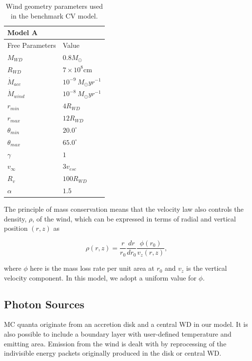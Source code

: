 \documentclass[preprint, a4paper, 11pt]{aastex}
\begin{document}
\begin{table}
\centering
\begin{tabular}{p{3cm}p{4cm}}
Model A \\
\hline Free Parameters 	&	 Value \\ 
\hline \hline 
$M_{WD}$ 	 &	 $0.8 M_{\odot}$ \\ 
$R_{WD}$ 	 &	 $7\times10^{8}$cm\\ 
$\dot{M}_{acc}$ 	 &	 $10^{-9}~M_{\odot}yr^{-1}$\\ 
$\dot{M}_{wind}$  &	$10^{-8}~M_{\odot}yr^{-1}$\\ 
$r_{min}$ 	&	 $4 R_{WD}$\\ 
$r_{max}$ 	&	 $12 R_{WD}$ \\ 
$\theta_{min}$ 	&	 $20.0^{\circ}$ \\ 
$\theta_{max}$ 	&	 $65.0^{\circ}$ \\ 
$\gamma$ 	&	 $1$ \\ 
$v_{\infty}$ 	&	 $3v_{esc}$ \\ 
$R_v$ 	        &	 $100 R_{WD}$ \\ 
$\alpha$ 	&	 $1.5$ \\
\end{tabular}
\centering
\caption{
Wind geometry parameters used in the benchmark CV model.}
\label{wind_param}
\end{table}


The principle of mass conservation means that the velocity law also 
controls the density, $\rho$, of the wind, which can be expressed in terms
of radial and vertical position $(r,z)$ as 

\begin{equation}
\rho(r,z) = \frac{r}{r_0} \frac{dr}{dr_0} \frac{\phi(r_0)}{v_z(r,z)},
\label{density}
\end{equation}

where $\phi$ here is the mass loss rate per unit area at $r_0$
and $v_z$ is the vertical velocity component. In this model, we
adopt a uniform value for $\phi$. 



\subsection{Photon Sources}

MC quanta originate from an accretion disk and a central WD in our model. It is also possible to include
a boundary layer with user-defined temperature and emitting area. Emission from the wind is dealt with
by reprocessing of the indivisible energy packets originally produced in the disk or central WD.
\end{document}
